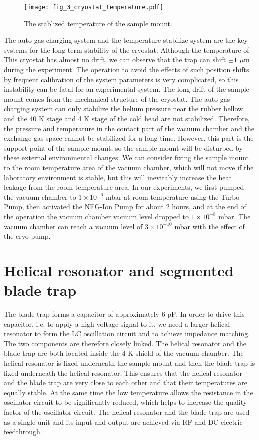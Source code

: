 \begin{figure}
    \centering
    \texttt{[image: fig\_3\_cryostat\_temperature.pdf]}
    \caption{The stablized temperature of the sample mount.}
    \label{fig:cryostat_temperature}
\end{figure}

The auto gas charging system and the temperature stabilize system are the key systems for the long-term stability of the cryostat. Although the temperature of This cryostat has almost no drift, we can observe that the trap can shift $\pm 1$ $\mu$m during the experiment. The operation to avoid the effects of such position shifts by frequent calibration of the system parameters is very complicated, so this instability can be fatal for an experimental system. The long drift of the sample mount comes from the mechanical structure of the cryostat. The auto gas charging system can only stabilize the helium pressure near the rubber bellow, and the 40 K stage and 4 K stage of the cold head are not stabilized. Therefore, the pressure and temperature in the contact part of the vacuum chamber and the exchange gas space cannot be stabilized for a long time. However, this part is the support point of the sample mount, so the sample mount will be disturbed by these external environmental changes. We can consider fixing the sample mount to the room temperature area of the vacuum chamber, which will not move if the laboratory environment is stable, but this will inevitably increase the heat leakage from the room temperature area. In our experiments, we first pumped the vacuum chamber to $1 \times {10}^{-6}$ mbar at room temperature using the Turbo Pump, then activated the NEG-Ion Pump for about 2 hours, and at the end of the operation the vacuum chamber vacuum level dropped to $1 \times {10}^{-8}$ mbar. The vacuum chamber can reach a vacuum level of $3 \times {10}^{-10}$ mbar with the effect of the cryo-pump.



\section{Helical resonator and segmented blade trap}

The blade trap forms a capacitor of approximately 6 pF. In order to drive this capacitor, i.e. to apply a high voltage signal to it, we need a larger helical resonator to form the LC oscillation circuit and to achieve impedance matching. The two components are therefore closely linked. The helical resonator and the blade trap are both located inside the 4 K shield of the vacuum chamber. The helical resonator is fixed underneath the sample mount and then the blade trap is fixed underneath the helical resonator. This ensures that the helical resonator and the blade trap are very close to each other and that their temperatures are equally stable. At the same time the low temperature allows the resistance in the oscillator circuit to be significantly reduced, which helps to increase the quality factor of the oscillator circuit. The helical resonator and the blade trap are used as a single unit and its input and output are achieved via RF and DC electric feedthrough.

